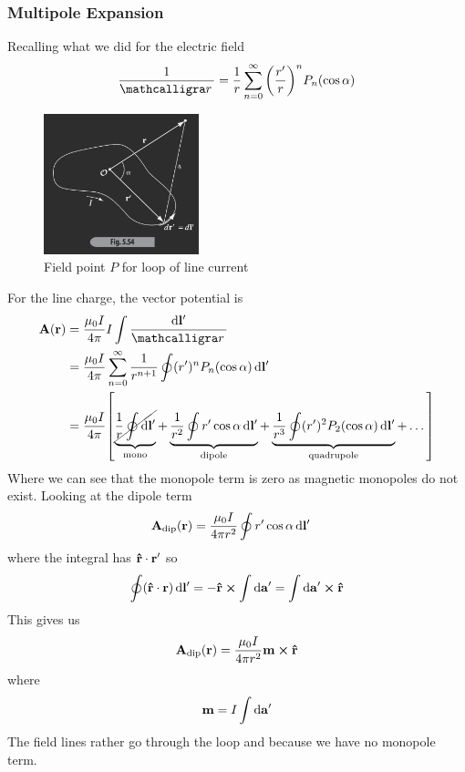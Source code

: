 \documentclass[../main.tex]{subfiles}
\begin{document}
\newpage
\subsubsection{Multipole Expansion}
Recalling what we did for the electric field
\begin{align*}
    \frac{1}{\scriptr} = \frac{1}{r} \sum_{n = 0}^\infty \qt(\frac{r'}{r})^n P_n (\cos\alpha)
\end{align*}
\begin{figure}[ht]
    \centering
    \includegraphics[width=0.4\textwidth]{fig5_54.png}
    \caption{Field point $P$ for loop of line current}
    \label{fig:5_54}
\end{figure}

For the line charge, the vector potential is
\begin{align*}
    \vb A (\vb r) &= \frac{\mu_0 I}{4\pi} I \int \frac{\dd{\vb l'}}{\scriptr} \\
    &= \frac{\mu_0 I}{4\pi} \sum_{n = 0}^\infty \frac{1}{r^{n+1}} \oint (r')^n P_n (\cos\alpha) \dd{\vb l'} \\
    &= \frac{\mu_0 I}{4\pi} \qt[
        \underbrace{\cancel{\frac{1}{r} \oint \dd{\vb l'}}}_{\text{mono}} 
        + \underbrace{\frac{1}{r^2} \oint r' \cos\alpha \dd{\vb l'}}_{\text{dipole}}
        + \underbrace{\frac{1}{r^3} \oint (r')^2 P_2 (\cos\alpha) \dd{\vb l'}}_{\text{quadrupole}}
        + \dots
    ]
\end{align*}
Where we can see that the monopole term is zero as magnetic monopoles do not exist.
Looking at the dipole term
\begin{align*}
    \vb A_\text{dip} (\vb r) &= \frac{\mu_0 I}{4\pi r^2} \oint r' \cos\alpha \dd{\vb l'}
\end{align*}
where the integral has $\vu r \cdot \vb r'$ so
\begin{align*}
    \oint (\vu r \cdot \vb r) \dd{\vb l'} = - \vu r \cross \int \dd{\vb a'} = \int \dd{\vb a'} \cross \vu r
\end{align*}
This gives us
\begin{align*}
    \vb A_\text{dip} (\vb r) = \frac{\mu_0 I}{4\pi r^2}  \vb m \cross \vu r
\end{align*}
where
\begin{align*}
    \vb m = I \int \dd{\vb a'}
\end{align*}
The field lines rather go through the loop and because we have no monopole term.
\end{document}
